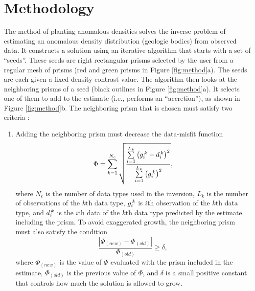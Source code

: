 \documentclass[twocolumn,final]{svjour3}
\begin{document}
\section{Methodology}

\begin{sloppypar}

The method of planting anomalous densities \citep{uieda_planting}
solves the inverse problem
of estimating an anomalous density distribution
(geologic bodies)
from observed data.
It constructs a solution
using an iterative algorithm
that starts with a set of ``seeds''.
These seeds are
right rectangular prisms
selected by the user
from a regular mesh of prisms
(red and green prisms in Figure \ref{fig:method}a).
The seeds are each given
a fixed density contrast value.
The algorithm then looks
at the neighboring prisms of a seed
(black outlines in Figure \ref{fig:method}a).
It selects one of them
to add to the estimate
(i.e., performs an ``accretion''),
as shown in Figure \ref{fig:method}b.
The neighboring prism that is chosen
must satisfy two criteria
\citep{uieda_shape}:

\begin{enumerate}
    \item Adding the neighboring prism
    must decrease the data-misfit function
    \begin{equation}
        \Phi = \sum\limits_{k=1}^{N_{c}} {
        \sqrt{
        \dfrac{
            \sum\limits_{i=1}^{L_k}
            \left( g_{i}^{\thinspace k} - d_{i}^{\thinspace k} \right)^{2}
        }{
            \sum\limits_{i=1}^{L_k}\left(g_{i}^{\thinspace k}\right)^{2}}
        }},
    \end{equation}
    where $N_c$ is the number of data types used in the inversion,
    $L_k$ is the number of observations of the $k$th data type,
    $g_i^{\thinspace k}$ is $i$th observation of the $k$th data type,
    and $d_i^{\thinspace k}$ is the $i$th data of the $k$th data type
    predicted by the estimate including the prism.
    To avoid exaggerated growth,
    the neighboring prism must also
    satisfy the condition
    \begin{equation}
        \dfrac{|\Phi_{(new)} - \Phi_{(old)}|}{\Phi_{(old)}} \ge \delta ,
        \label{eq:delta}
    \end{equation}
    where $\Phi_{(new)}$ is the value of $\Phi$ evaluated with the
    prism included in the estimate, $\Phi_{(old)}$ is the previous value of
    $\Phi$, and $\delta$ is a small positive constant that controls
    how much the solution is allowed to grow.


\end{enumerate}
\end{sloppypar}
\end{document}
